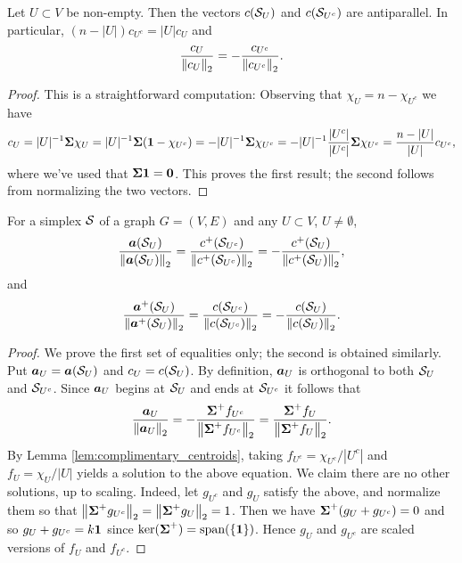 \begin{lemma}
\label{lem:complimentary_centroids}
Let $U\subset V$ be non-empty. Then the vectors $c(\mathcal{S}_U)$ and $c(\mathcal{S}_{U^c})$ are antiparallel. In particular, $(n-|U|)c_{U^c} = |U|c_{U}$ and 
\[\frac{c_U}{\norm{c_U}_2}=-\frac{c_{U^c}}{\norm{c_{U^c}}_2}.\]
\end{lemma}
\begin{proof}
This is a straightforward computation: Observing that $\chi_U=n-\chi_{U^c}$ we have  
\[c_U = |U|^{-1}\boldsymbol{\Sigma}\chi_U = |U|^{-1}\boldsymbol{\Sigma}(\vb{1}-\chi_{U^c})=-|U|^{-1}\boldsymbol{\Sigma}\chi_{U^c}=-|U|^{-1}\frac{|U^c|}{|U^c|}\boldsymbol{\Sigma}\chi_{U^c}=\frac{n-|U|}{|U|}c_{U^c},\]
where we've used that $\boldsymbol{\Sigma}\vb{1}=\vb{0}$. This proves the first result; the second follows from normalizing the two vectors.
\end{proof}

\begin{lemma}
\label{lem:alt_and_centroid}
For a simplex $\mathcal{S}$ of a graph $G=(V,E)$ and any $U\subset V$, $U\neq\emptyset$, 
\begin{equation*}
    \frac{\vb*{a}(\mathcal{S}_U)}{\norm{\vb*{a}(\mathcal{S}_{U})}_2}=\frac{c^+(\mathcal{S}_{U^c})}{\norm{c^+(\mathcal{S}_{U^c})}_2}=-\frac{c^+(\mathcal{S}_{U})}{\norm{c^+(\mathcal{S}_{U})}_2},
\end{equation*}
and 
\begin{equation*}
    \frac{\vb*{a}^+(\mathcal{S}_U)}{\norm{\vb*{a}^+(\mathcal{S}_{U})}_2}=\frac{c(\mathcal{S}_{U^c})}{\norm{c(\mathcal{S}_{U^c})}_2}=-\frac{c(\mathcal{S}_{U})}{\norm{c(\mathcal{S}_{U})}_2}.
\end{equation*}
\end{lemma}
\begin{proof}
We prove the first set of  equalities only; the second is obtained similarly. 
Put $\vb*{a}_U=\vb*{a}(\mathcal{S}_U)$ and $c_U=c(\mathcal{S}_U)$. By definition, $\vb*{a}_U$ is orthogonal to both $\mathcal{S}_U$ and $\mathcal{S}_{U^c}$.  Since $\vb*{a}_U$ begins at $\mathcal{S}_U$ and ends at $\mathcal{S}_{U^c}$ it follows that 
\begin{equation*}
    \frac{\vb*{a}_U}{\norm{\vb*{a}_U}_2}=-\frac{\boldsymbol{\Sigma}^+f_{U^c}}{\norm{\boldsymbol{\Sigma}^+f_{U^c}}_2}=\frac{\boldsymbol{\Sigma}^+f_{U}}{\norm{\boldsymbol{\Sigma}^+f_{U}}_2}.
\end{equation*}
By Lemma \ref{lem:complimentary_centroids}, taking $f_{U^c}=\chi_{U^c}/|U^c|$ and $f_U=\chi_U/|U|$ yields a solution to the above equation. We claim there are no other solutions, up to scaling. Indeed, let $g_{U^c}$ and $g_U$ satisfy the above, and normalize them so that $\norm{\boldsymbol{\Sigma}^+g_{U^c}}_2=\norm{\boldsymbol{\Sigma}^+g_U}_2=1$. Then we have $\boldsymbol{\Sigma}^+(g_U+g_{U^c})=0$ and so $g_U+g_{U^c}=k\vb{1}$ since $\ker(\boldsymbol{\Sigma}^+)=\textnormal{span}(\{\vb{1}\})$. Hence $g_U$ and $g_{U^c}$ are scaled versions of $f_U$ and $f_{U^c}$.  
\end{proof}

